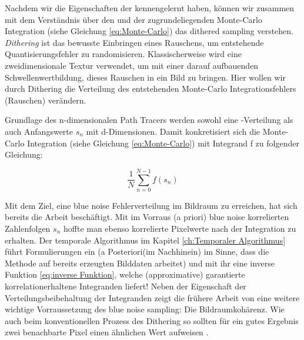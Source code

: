 \label{subsec:dither sampling}
Nachdem wir die Eigenschaften der  kennengelernt haben,
können wir zusammen mit dem Verständnis über den  und der 
zugrundeliegenden Monte-Carlo Integration (siehe Gleichung \ref{eq:Monte-Carlo}) das \glqq dithered sampling\grqq{} verstehen.
\textit{Dithering} ist das bewusste Einbringen eines Rauschens, um entstehende Quantisierungsfehler zu randomisieren.
Klassischerweise wird eine zweidimensionale  Textur verwendet, um mit einer darauf aufbauenden Schwellenwertbildung,
dieses Rauschen in ein Bild zu bringen. Hier wollen wir durch Dithering die Verteilung des entstehenden Monte-Carlo Integrationsfehlers (Rauschen) verändern.\par
Grundlage des n-dimensionalen Path Tracers werden sowohl eine -Verteilung als auch Anfangswerte $s_{n}$ mit d-Dimensionen.
Damit konkretisiert sich die Monte-Carlo Integration (siehe Gleichung \ref{eq:Monte-Carlo}) mit Integrand f zu folgender Gleichung:

\begin{tcolorbox}[rightrule=3mm, rounded corners=east]
    \begin{equation}\label{eq:concreteMonteCarlo}
        \frac{1}{N}\sum_{n=0}^{N-1}f(s_{n})
    \end{equation}
\end{tcolorbox}


Mit dem Ziel, eine blue noise Fehlerverteilung im Bildraum zu erreichen, hat sich bereits die Arbeit \cite{georgiev2016blue} beschäftigt. 
Mit im Vorraus (\glqq a priori\grqq{}) blue noise korrelierten Zahlenfolgen $s_{n}$ hoffte man ebenso korrelierte Pixelwerte nach 
der Integration zu erhalten. Der temporale Algorithmus im Kapitel \ref{ch:Temporaler Algorithmus} führt 
Formulierungen ein (\glqq a Posteriori\grqq{}(im Nachhinein) im Sinne, dass die Methode auf bereits erzeugten Bilddaten arbeitet) und mit ihr eine 
inverse Funktion \ref{eq:inverse Funktion}, welche (approximative) garantierte korrelationerhaltene Integranden liefert!  
Neben der Eigenschaft der Verteilungsbeibehaltung der Integranden zeigt die frühere Arbeit von \cite[Seite 3]{hal02158423} eine weitere wichtige Vorraussetzung 
des blue noise sampling: Die Bildraumkohärenz. Wie auch beim konventionellen Prozess des Dithering so sollten für ein gutes Ergebnis zwei benachbarte 
Pixel einen ähnlichen Wert aufweisen \cite{3288}.




